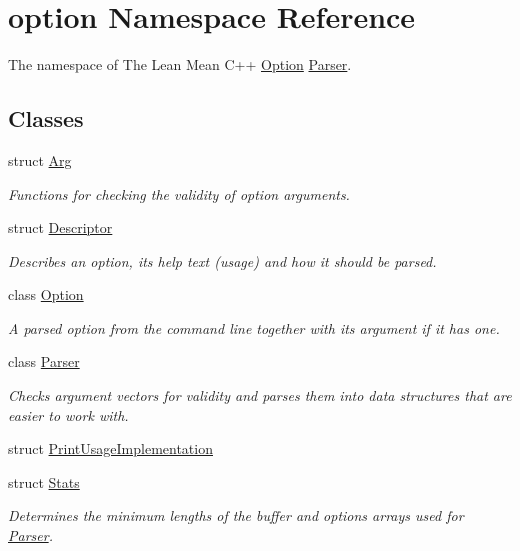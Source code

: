 \hypertarget{namespaceoption}{}\section{option Namespace Reference}
\label{namespaceoption}


The namespace of The Lean Mean C++ \hyperlink{classoption_1_1_option}{Option} \hyperlink{classoption_1_1_parser}{Parser}.  


\subsection*{Classes}
\begin{DoxyCompactItemize}
\item 
struct \hyperlink{structoption_1_1_arg}{Arg}
\begin{DoxyCompactList}\small\item\em Functions for checking the validity of option arguments. \end{DoxyCompactList}\item 
struct \hyperlink{structoption_1_1_descriptor}{Descriptor}
\begin{DoxyCompactList}\small\item\em Describes an option, its help text (usage) and how it should be parsed. \end{DoxyCompactList}\item 
class \hyperlink{classoption_1_1_option}{Option}
\begin{DoxyCompactList}\small\item\em A parsed option from the command line together with its argument if it has one. \end{DoxyCompactList}\item 
class \hyperlink{classoption_1_1_parser}{Parser}
\begin{DoxyCompactList}\small\item\em Checks argument vectors for validity and parses them into data structures that are easier to work with. \end{DoxyCompactList}\item 
struct \hyperlink{structoption_1_1_print_usage_implementation}{Print\+Usage\+Implementation}
\item 
struct \hyperlink{structoption_1_1_stats}{Stats}
\begin{DoxyCompactList}\small\item\em Determines the minimum lengths of the buffer and options arrays used for \hyperlink{classoption_1_1_parser}{Parser}. \end{DoxyCompactList}\end{DoxyCompactItemize}
